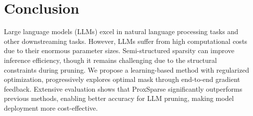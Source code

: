 \section{Conclusion}


Large language models (LLMs) excel in natural language processing tasks and other downstreaming tasks. However, LLMs suffer from high computational costs due to their enormous parameter sizes. Semi-structured sparsity can improve inference efficiency, though it remains challenging due to the structural constraints during pruning. We propose a learning-based method with regularized optimization, progressively explores optimal mask through end-to-end gradient feedback. Extensive evaluation shows that ProxSparse significantly outperforms previous methods, enabling better accuracy for LLM pruning, making model deployment more cost-effective.